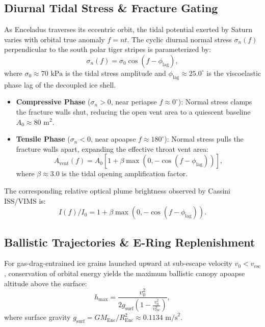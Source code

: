 \documentclass[11pt,a4paper]{article}
\begin{document}
\subsection{Diurnal Tidal Stress \& Fracture Gating}
As Enceladus traverses its eccentric orbit, the tidal potential exerted by Saturn varies with orbital true anomaly $f = n t$. The cyclic diurnal normal stress $\sigma_n(f)$ perpendicular to the south polar tiger stripes is parameterized by:
\begin{equation}
\sigma_n(f) = \sigma_0 \cos(f - \phi_{\mathrm{lag}}),
\end{equation}
where $\sigma_0 \approx 70\text{ kPa}$ is the tidal stress amplitude and $\phi_{\mathrm{lag}} \approx 25.0^\circ$ is the viscoelastic phase lag of the decoupled ice shell.
\begin{itemize}
    \item \textbf{Compressive Phase} ($\sigma_n > 0$, near periapse $f \approx 0^\circ$): Normal stress clamps the fracture walls shut, reducing the open vent area to a quiescent baseline $A_0 \approx 80\text{ m}^2$.
    \item \textbf{Tensile Phase} ($\sigma_n < 0$, near apoapse $f \approx 180^\circ$): Normal stress pulls the fracture walls apart, expanding the effective throat vent area:
    \begin{equation}
    A_{\mathrm{vent}}(f) = A_0 \left[ 1 + \beta \max\left(0, -\cos(f - \phi_{\mathrm{lag}})\right) \right],
    \end{equation}
    where $\beta \approx 3.0$ is the tidal opening amplification factor.
\end{itemize}
The corresponding relative optical plume brightness observed by Cassini ISS/VIMS is:
\begin{equation}
I(f) / I_0 = 1 + \beta \max\left(0, -\cos(f - \phi_{\mathrm{lag}})\right).
\end{equation}

\subsection{Ballistic Trajectories \& E-Ring Replenishment}
For gas-drag-entrained ice grains launched upward at sub-escape velocity $v_0 < v_{\mathrm{esc}}$, conservation of orbital energy yields the maximum ballistic canopy apoapse altitude above the surface:
\begin{equation}
h_{\mathrm{max}} = \frac{v_0^2}{2 g_{\mathrm{surf}} \left( 1 - \frac{v_0^2}{v_{\mathrm{esc}}^2} \right)},
\end{equation}
where surface gravity $g_{\mathrm{surf}} = G M_{\mathrm{Enc}} / R_{\mathrm{Enc}}^2 \approx 0.1134\text{ m/s}^2$.
\end{document}
